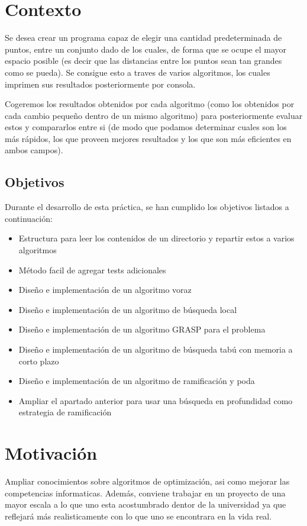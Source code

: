 \section{Contexto}

Se desea crear un programa capaz de elegir una cantidad predeterminada de puntos, entre un conjunto dado de los cuales, de forma que se ocupe el mayor espacio posible (es decir que las distancias entre los puntos sean tan grandes como se pueda). Se consigue esto a traves de varios algoritmos, los cuales imprimen sus resultados posteriormente por consola. 

Cogeremos los resultados obtenidos por cada algoritmo (como los obtenidos por cada cambio pequeño dentro de un mismo algoritmo) para posteriormente evaluar estos y compararlos entre si (de modo que podamos determinar cuales son los más rápidos, los que proveen mejores resultados y los que son más eficientes en ambos campos).

\subsection{Objetivos}

Durante el desarrollo de esta práctica, se han cumplido los objetivos listados a continuación:
\begin{itemize}
   \item Estructura para leer los contenidos de un directorio y repartir estos a varios algoritmos
   \item Método facil de agregar tests adicionales
   \item Diseño e implementación de un algoritmo voraz
   \item Diseño e implementación de un algoritmo de búsqueda local
   \item Diseño e implementación de un algoritmo GRASP para el problema
   \item Diseño e implementación de un algoritmo de búsqueda tabú con memoria a corto plazo
   \item Diseño e implementación de un algoritmo de ramificación y poda
   \item Ampliar el apartado anterior para usar una búsqueda en profundidad como estrategia de ramificación
\end{itemize}

\section{Motivación}

Ampliar conocimientos sobre algoritmos de optimización, asi como mejorar las competencias informaticas. Además, conviene trabajar en un proyecto de una mayor escala a lo que uno esta acostumbrado dentor de la universidad ya que reflejará más realisticamente con lo que uno se encontrara en la vida real.